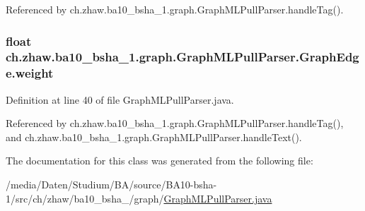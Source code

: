 Referenced by ch.zhaw.ba10\_\-bsha\_\-1.graph.GraphMLPullParser.handleTag().\hypertarget{classch_1_1zhaw_1_1ba10__bsha__1_1_1graph_1_1GraphMLPullParser_1_1GraphEdge_ab07b6563dfd9148c9097f29edd1e5e03}{
\subsubsection[{weight}]{\setlength{\rightskip}{0pt plus 5cm}float {\bf ch.zhaw.ba10\_\-bsha\_\-1.graph.GraphMLPullParser.GraphEdge.weight}}}
\label{classch_1_1zhaw_1_1ba10__bsha__1_1_1graph_1_1GraphMLPullParser_1_1GraphEdge_ab07b6563dfd9148c9097f29edd1e5e03}


Definition at line 40 of file GraphMLPullParser.java.

Referenced by ch.zhaw.ba10\_\-bsha\_\-1.graph.GraphMLPullParser.handleTag(), and ch.zhaw.ba10\_\-bsha\_\-1.graph.GraphMLPullParser.handleText().

The documentation for this class was generated from the following file:\begin{DoxyCompactItemize}
\item 
/media/Daten/Studium/BA/source/BA10-\/bsha-\/1/src/ch/zhaw/ba10\_\-bsha\_/graph/\hyperlink{GraphMLPullParser_8java}{GraphMLPullParser.java}\end{DoxyCompactItemize}
